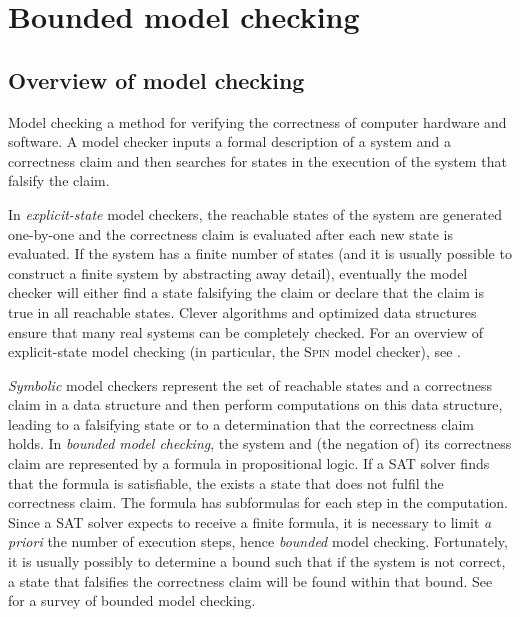 \documentclass[11pt]{report}
\begin{document}

\chapter{Bounded model checking}\label{ch.model}

\section{Overview of model checking}

Model checking a method for verifying the correctness of computer
hardware and software. A model checker inputs a formal description of a
system and a correctness claim and then searches for states in the
execution of the system that falsify the claim.

In \emph{explicit-state} model checkers, the reachable states of the
system are generated one-by-one and the correctness claim is evaluated
after each new state is evaluated. If the system has a finite number of
states (and it is usually possible to construct a finite system by
abstracting away detail), eventually the model checker will either find
a state falsifying the claim or declare that the claim is true in all
reachable states. Clever algorithms and optimized data structures ensure
that many real systems can be completely checked. For an overview of
explicit-state model checking (in particular, the \textsc{Spin} model
checker), see \cite{primer}.

\emph{Symbolic} model checkers represent the set of reachable states and
a correctness claim in a data structure and then perform computations on
this data structure, leading to a falsifying state or to a determination
that the correctness claim holds. In \emph{bounded model checking}, the
system and (the negation of) its correctness claim are represented by a
formula in propositional logic. If a SAT solver finds that the formula
is satisfiable, the exists a state that does not fulfil the correctness
claim. The formula has subformulas for each step in the computation.
Since a SAT solver expects to receive a finite formula, it is necessary
to limit \textit{a priori} the number of execution steps, hence
\emph{bounded} model checking. Fortunately, it is usually possibly to
determine a bound such that if the system is not correct, a state that
falsifies the correctness claim will be found within that bound. See
\cite{bmc} for a survey of bounded model checking.

\newpage
\end{document}
